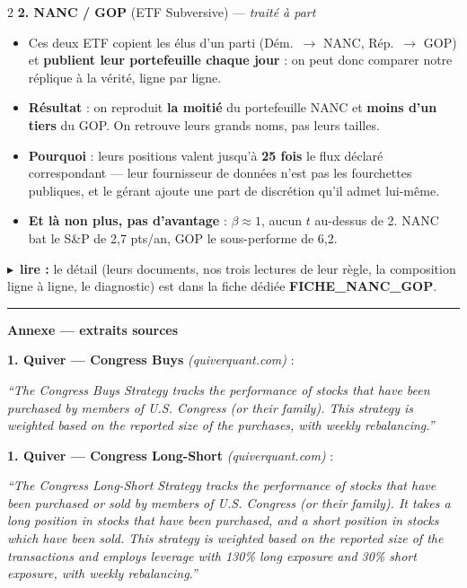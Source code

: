 \documentclass[9pt,a4paper]{extarticle}
\newcommand{\lire}[1]{{\scriptsize\color{vert}$\blacktriangleright$~\textbf{lire :} #1}\par}
\newenvironment{pts}{\begin{itemize}[leftmargin=3.4mm,itemsep=0.2mm,topsep=0.4mm,parsep=0pt,label={\color{bleu}\footnotesize\textbullet}]}{\end{itemize}}
\begin{document}
\begin{multicols}{2}
\textbf{2. NANC / GOP} (ETF Subversive) --- \emph{traité à part}
\begin{pts}
\item Ces deux ETF copient les élus d'un parti (Dém.\ $\to$ NANC, Rép.\ $\to$ GOP) et \textbf{publient leur portefeuille chaque jour} : on peut donc comparer notre réplique à la vérité, ligne par ligne.
\item \textbf{Résultat} : on reproduit \textbf{la moitié} du portefeuille NANC et \textbf{moins d'un tiers} du GOP. On retrouve leurs grands noms, pas leurs tailles.
\item \textbf{Pourquoi} : leurs positions valent jusqu'à \textbf{25 fois} le flux déclaré correspondant --- leur fournisseur de données n'est pas les fourchettes publiques, et le gérant ajoute une part de discrétion qu'il admet lui-même.
\item \textbf{Et là non plus, pas d'avantage} : $\beta\approx1$, aucun $t$ au-dessus de 2. NANC bat le S\&P de 2,7 pts/an, GOP le sous-performe de 6,2.
\end{pts}
\lire{le détail (leurs documents, nos trois lectures de leur règle, la composition ligne à ligne, le diagnostic) est dans la fiche dédiée \textbf{FICHE\_NANC\_GOP}.}
\end{multicols}

\vspace{2mm}\hrule\vspace{1.5mm}
{\color{bleu}\bfseries\large Annexe --- extraits sources}\par\vspace{2mm}

\textbf{1. Quiver --- Congress Buys} \emph{(quiverquant.com)} :
{\footnotesize\itshape ``The Congress Buys Strategy tracks the performance of stocks that have been purchased by members of U.S. Congress (or their family). This strategy is weighted based on the reported size of the purchases, with weekly rebalancing.''\par}
\vspace{1.5mm}

\textbf{1. Quiver --- Congress Long-Short} \emph{(quiverquant.com)} :
{\footnotesize\itshape ``The Congress Long-Short Strategy tracks the performance of stocks that have been purchased or sold by members of U.S. Congress (or their family). It takes a long position in stocks that have been purchased, and a short position in stocks which have been sold. This strategy is weighted based on the reported size of the transactions and employs leverage with 130\% long exposure and 30\% short exposure, with weekly rebalancing.''\par}
\vspace{2mm}
\end{document}
